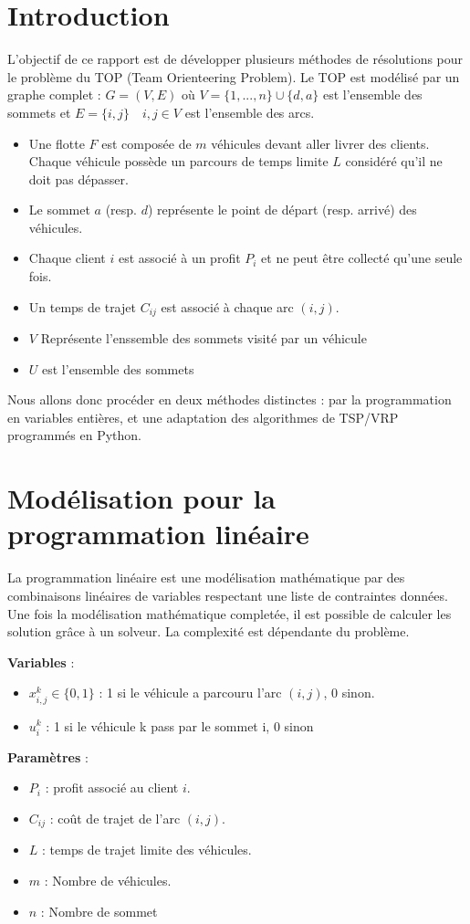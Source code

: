 \documentclass[a4paper, 12pt, DIV=12]{scrartcl}
\begin{document}
\section{Introduction}
    L'objectif de ce rapport est de développer plusieurs méthodes de résolutions pour le problème du TOP (Team Orienteering Problem). Le TOP est modélisé par un graphe complet :  $G = (V,E)$ où $V = \{1,...,n\} \cup \{d,a\} $ est l'ensemble des sommets et $E = \{i,j\} \quad i,j \in V $ est l'ensemble des arcs.\\
    \begin{itemize}
        \item Une flotte ${F}$ est composée de $m$ véhicules devant aller livrer des clients. Chaque véhicule possède un parcours de temps limite ${L}$ considéré qu'il ne doit pas dépasser.
        \item Le sommet $a$ (resp. $d$) représente le point de départ (resp. arrivé) des véhicules.
        \item Chaque client $i$ est associé à un profit  $P_i$ et ne peut être collecté qu'une seule fois.
        \item Un temps de trajet $C_{ij}$ est associé à chaque arc $(i,j)$.
        \item $V$ Représente l'enssemble des sommets visité par un véhicule
        \item $U$ est l'ensemble des sommets
    \end{itemize}
Nous allons donc procéder en deux méthodes distinctes : par la programmation en variables entières, et une adaptation  des algorithmes de TSP/VRP programmés en Python.      

\section{Modélisation pour la programmation linéaire}

La programmation linéaire est une modélisation mathématique par des combinaisons linéaires de variables respectant une liste de contraintes données. Une fois la modélisation mathématique completée, il est possible de calculer les solution grâce à un solveur.
La complexité est dépendante du problème. 

\textbf{Variables} : 
\begin{itemize}
    \item $x^k_{i,j} \in \{0,1\}$ : 1 si le véhicule a parcouru l'arc $(i,j)$, 0 sinon.
    \item $u^k_i$ : 1 si le véhicule k pass par le sommet i, 0 sinon
\end{itemize} 
\textbf{Paramètres} : 
\begin{itemize}
    \item $P_i$ : profit associé au client $i$.
    \item $C_{ij}$ : coût de trajet de l'arc $(i,j)$.
    \item $L$ : temps de trajet limite des véhicules.
    \item $m$ : Nombre de véhicules.
    \item $n$ : Nombre de sommet
\end{itemize}
\end{document}
